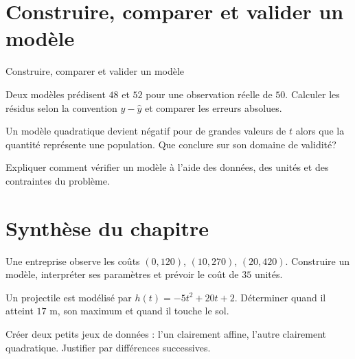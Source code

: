 \section{Construire, comparer et valider un modèle}
\label{workbook:section:04.07}
\begin{exerciseblock}{Construire, comparer et valider un modèle}
\item Deux modèles prédisent $48$ et $52$ pour une observation réelle de $50$. Calculer les résidus selon la convention $y-\widehat y$ et comparer les erreurs absolues.
\item Un modèle quadratique devient négatif pour de grandes valeurs de $t$ alors que la quantité représente une population. Que conclure sur son domaine de validité?
\item Expliquer comment vérifier un modèle à l'aide des données, des unités et des contraintes du problème.
\end{exerciseblock}
\section*{Synthèse du chapitre}
\begin{synthesisbox}
\item Une entreprise observe les coûts $(0,120)$, $(10,270)$, $(20,420)$. Construire un modèle, interpréter ses paramètres et prévoir le coût de $35$ unités.
\item Un projectile est modélisé par $h(t)=-5t^2+20t+2$. Déterminer quand il atteint $17$ m, son maximum et quand il touche le sol.
\item Créer deux petits jeux de données : l'un clairement affine, l'autre clairement quadratique. Justifier par différences successives.
\end{synthesisbox}
